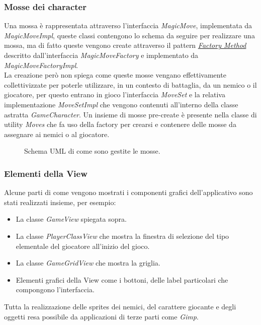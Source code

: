\documentclass[a4paper,12pt]{report}
\begin{document}
\subsubsection{Mosse dei character}
Una mossa è rappresentata attraverso l'interfaccia \textit{MagicMove}, implementata da \textit{MagicMoveImpl}, queste classi contengono lo schema da seguire per realizzare una mossa, ma di fatto queste vengono create attraverso il pattern \href{https://refactoring.guru/design-patterns/factory-method}{\textit{Factory Method}} descritto dall'interfaccia \textit{MagicMoveFactory} e implementato da \textit{MagicMoveFactoryImpl}. \\ La creazione però non spiega come queste mosse vengano effettivamente collettivizzate per poterle utilizzare, in un contesto di battaglia, da un nemico o il giocatore, per questo entrano in gioco l'interfaccia \textit{MoveSet} e la relativa implementazione \textit{MoveSetImpl} che vengono contenuti all'interno della classe astratta \textit{GameCharacter}. Un insieme di mosse pre-create è presente nella classe di utility \textit{Moves} che fa uso della factory per crearsi e contenere delle mosse da assegnare ai nemici o al giocatore.\\

\begin{figure}[H]
	\centering
	
	\caption{Schema UML di come sono gestite le mosse.}
	\label{fig:Schema UML di come sono gestite le mosse.}
\end{figure}

\subsubsection{Elementi della View}
Alcune parti di come vengono mostrati i componenti grafici dell'applicativo sono stati realizzati insieme, per esempio:
\begin{itemize}
	\item La classe \textit{GameView} spiegata sopra.
	\item La classe \textit{PlayerClassView} che mostra la finestra di selezione del tipo elementale del giocatore all'inizio del gioco.
	\item La classe \textit{GameGridView} che mostra la griglia.
	\item Elementi grafici della View come i bottoni, delle label particolari che compongono l'interfaccia.
\end{itemize}

Tutta la realizzazione delle sprites dei nemici, del carattere giocante e degli oggetti resa possibile da applicazioni di terze parti come \textit{Gimp}.
\end{document}

